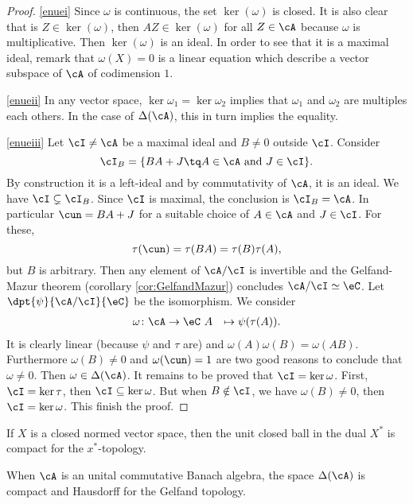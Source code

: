 \begin{proof}
\ref{enuei} Since $\omega$ is continuous, the set $\ker(\omega)$ is closed. It is also clear that is $Z\in\ker(\omega)$, then $AZ\in\ker(\omega)$ for all $Z\in\cA$ because $\omega$ is multiplicative. Then $\ker(\omega)$ is an ideal. In order to see that it is a maximal ideal, remark that $\omega(X)=0$ is a linear equation which describe a vector subspace of $\cA$ of codimension\label{pg_codimun} $1$.

\ref{enueii} In any vector space, $\ker{\omega_1}=\ker{\omega_2}$ implies that $\omega_1$ and $\omega_2$ are multiples each others. In the case of $\Delta(\cA)$, this in turn implies the equality.

\ref{enueiii} Let $\cI\neq\cA$ be a maximal ideal and $B\neq 0$ outside $\cI$. Consider
\[
\cI_B=\{BA+J\tq A\in\cA\textrm{ and }J\in\cI\}.
\]
By construction it is a left-ideal and by commutativity of $\cA$, it is an ideal. We have $\cI\subsetneq\cI_B$. Since $\cI$ is maximal, the conclusion is $\cI_B=\cA$. In particular $\cun=BA+J$ for a suitable choice of $A\in\cA$ and $J\in\cI$. For these,
\[
  \tau(\cun)=\tau(BA)=\tau(B)\tau(A),
\]
but $B$ is arbitrary. Then any element of $\cA/\cI$ is invertible and the Gelfand-Mazur theorem (corollary \ref{cor:GelfandMazur}) concludes $\cA/\cI\simeq\eC$. Let $\dpt{\psi}{\cA/\cI}{\eC}$ be the isomorphism. We consider
        \begin{equation}
        \begin{aligned}
            \omega \colon \cA &\to \eC\
            A&\mapsto \psi(\tau(A)).
        \end{aligned}
    \end{equation}  
It is clearly linear (because $\psi$ and $\tau$ are) and $\omega(A)\omega(B)=\omega(AB)$. Furthermore $\omega(B)\neq 0$ and $\omega(\cun)=1$ are two good reasons to conclude that $\omega\neq 0$. Then $\omega\in\Delta(\cA)$. It remains to be proved that $\cI=\ker\omega$. First, $\cI=\ker\tau$, then $\cI\subseteq\ker\omega$. But when $B\notin\cI$, we have $\omega(B)\neq 0$, then $\cI=\ker\omega$. This finish the proof.
\end{proof}


\begin{theorem} 
If $X$ is a closed normed vector space, then the unit closed ball in the dual $X^*$ is compact for the $x^*$-topology.
 \label{tho:Banach_Alaoglu}
\end{theorem}

\begin{proposition}
When $\cA$ is an unital commutative Banach algebra, the space $\Delta(\cA)$ is compact and Hausdorff for the Gelfand topology.
\end{proposition} \label{prop:DcA_comp_Hauss}\lref{2.3.4}

